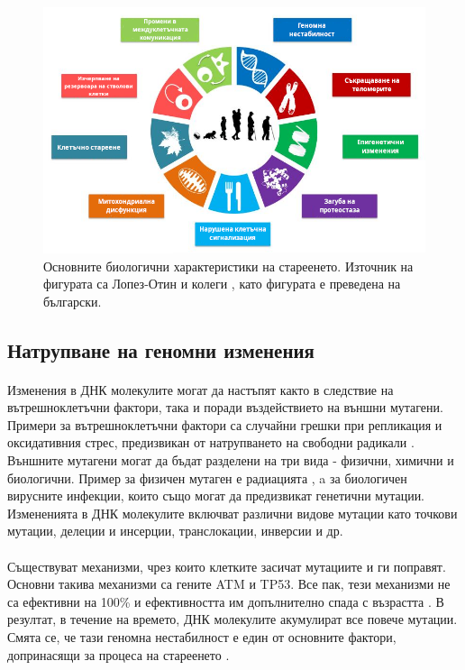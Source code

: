 \documentclass[pdftex,cyrillic,14pt,a4page,twoside,openright]{extreport}
\begin{document}
\begin{figure}[htp]
  \centering
  \includegraphics[width=15cm]{figures/biological_characteristics_of_aging}
  \caption {Основните биологични характеристики на стареенето. Източник на фигурата са Лопез-Отин и колеги \cite{lopezotin2013}, като фигурата е преведена на български.}
  \label{fig:biological_characteristics_of_aging}
\end{figure}

\subsection{Натрупване на геномни изменения}
\paragraph{}
Изменения в ДНК молекулите могат да настъпят както в следствие на вътрешноклетъчни фактори, така и поради въздействието на външни мутагени. Примери за вътрешноклетъчни фактори са случайни грешки при репликация и оксидативния стрес, предизвикан от натрупването на свободни радикали \cite{wang1998}. Външните мутагени могат да бъдат разделени на три вида - физични, химични и биологични. Пример за физичен мутаген е радиацията \cite{breimer1988}, a за биологичен вирусните инфекции, които също могат да предизвикат генетични мутации. Измененията в ДНК молекулите включват различни видове мутации като точкови мутации, делеции и инсерции, транслокации, инверсии и др.\\\\
Съществуват механизми, чрез които клетките засичат мутациите и ги поправят. Основни такива механизми са гените ATM и TP53. Все пак, тези механизми не са ефективни на 100\% и ефективността им допълнително спада с възрастта \cite{auley2017}. В резултат, в течение на времето, ДНК молекулите акумулират все повече мутации. Смята се, че тази геномна нестабилност е един от основните фактори, допринасящи за процеса на стареенето \cite{vijg2013}.
\end{document}
